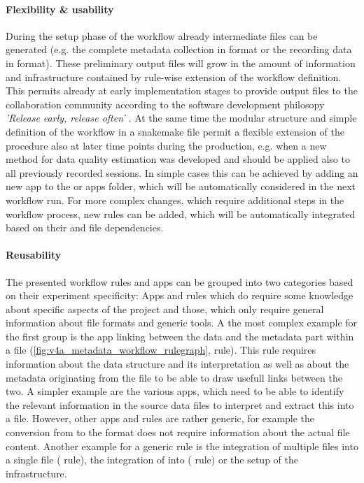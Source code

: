 \paragraph{Flexibility \& usability}
During the setup phase of the workflow already intermediate files can be generated (e.g. the complete metadata collection in  format or the recording data in  format). These preliminary output files will grow in the amount of information and infrastructure contained by rule-wise extension of the workflow definition. This permits already at early implementation stages to provide output files to the collaboration community according to the software development philosopy \textit{'Release early, release often'} \citep{Martin_2008}. At the same time the modular structure and simple definition of the workflow in a snakemake file permit a flexible extension of the procedure also at later time points during the production, e.g. when a new method for data quality estimation was developed and should be applied also to all previously recorded sessions. In simple cases this can be achieved by adding an new app to the  or  apps folder, which will be automatically considered in the next workflow run. For more complex changes, which require additional steps in the workflow process, new rules can be added, which will be automatically integrated based on their  and  file dependencies.

\paragraph{Reusability}
The presented workflow rules and apps can be grouped into two categories based on their experiment specificity: Apps and rules which do require some knowledge about specific aspects of the project and those, which only require general information about file formats and generic tools. A the most complex example for the first group is the app linking between the data and the metadata part within a  file (\cref{fig:v4a_metadata_workflow_rulegraph},  rule). This rule requires information about the data structure and its interpretation as well as about the metadata originating from the  file to be able to draw usefull links between the two. A simpler example are the various  apps, which need to be able to identify the relevant information in the source data files to interpret and extract this into a  file.
However, other apps and rules are rather generic, for example the conversion from  to the  format does not require information about the actual file content. Another example for a generic rule is the integration of multiple  files into a single file ( rule), the integration of  into  ( rule) or the setup of the  infrastructure.

